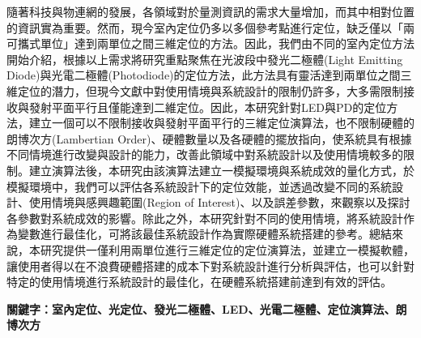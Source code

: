 \begin{abstractCH}

  隨著科技與物連網的發展，各領域對於量測資訊的需求大量增加，而其中相對位置的資訊實為重要。然而，現今室內定位仍多以多個參考點進行定位，缺乏僅以「兩可攜式單位」達到兩單位之間三維定位的方法。因此，我們由不同的室內定位方法開始介紹，根據以上需求將研究重點聚焦在光波段中發光二極體(Light Emitting Diode)與光電二極體(Photodiode)的定位方法，此方法具有靈活達到兩單位之間三維定位的潛力，但現今文獻中對使用情境與系統設計的限制仍許多，大多需限制接收與發射平面平行且僅能達到二維定位。因此，本研究針對LED與PD的定位方法，建立一個可以不限制接收與發射平面平行的三維定位演算法，也不限制硬體的朗博次方(Lambertian Order)、硬體數量以及各硬體的擺放指向，使系統具有根據不同情境進行改變與設計的能力，改善此領域中對系統設計以及使用情境較多的限制。建立演算法後，本研究由該演算法建立一模擬環境與系統成效的量化方式，於模擬環境中，我們可以評估各系統設計下的定位效能，並透過改變不同的系統設計、使用情境與感興趣範圍(Region of Interest)、以及誤差參數，來觀察以及探討各參數對系統成效的影響。除此之外，本研究針對不同的使用情境，將系統設計作為變數進行最佳化，可將該最佳系統設計作為實際硬體系統搭建的參考。總結來說，本研究提供一僅利用兩單位進行三維定位的定位演算法，並建立一模擬軟體，讓使用者得以在不浪費硬體搭建的成本下對系統設計進行分析與評估，也可以針對特定的使用情境進行系統設計的最佳化，在硬體系統搭建前達到有效的評估。


  \vspace{1cm}
  \noindent \textbf{關鍵字：室內定位、光定位、發光二極體、LED、光電二極體、定位演算法、朗博次方}

\end{abstractCH}

